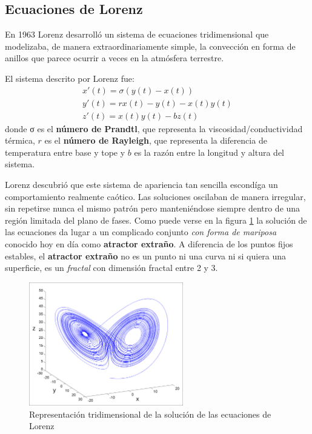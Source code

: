 \subsection{Ecuaciones de Lorenz}
\begin{definition}
En 1963 Lorenz desarrolló un sistema de ecuaciones tridimensional que modelizaba, de manera extraordinariamente simple, la convección en forma de anillos que parece ocurrir a veces en la atmósfera terrestre.

El sistema descrito por Lorenz fue:
\[\begin{array}{l}
x'(t) = σ(y(t)-x(t)) \\
y'(t) = rx(t)-y(t)-x(t)y(t)\\
z'(t) = x(t)y(t)-bz(t)
\end{array}\]
donde σ es el \textbf{número de Prandtl}, que representa la viscosidad/conductividad térmica, $r$ es el \textbf{número de Rayleigh}, que representa la diferencia de temperatura entre base y tope y $b$ es la razón entre la longitud y altura del sistema.
\end{definition}

Lorenz descubrió que este sistema de apariencia tan sencilla escondíga un comportamiento realmente caótico. Las soluciones oscilaban de manera irregular, sin repetirse nunca el mismo patrón pero manteniéndose siempre dentro de una región limitada del plano de fases. Como puede verse en la figura \ref{fig:Lorenz} la solución de las ecuaciones da lugar a un complicado conjunto \emph{con forma de mariposa} conocido hoy en día como \textbf{atractor extraño}. A diferencia de los puntos fijos estables, el \textbf{atractor extraño} no es un punto ni una curva ni si quiera una superficie, es un \emph{fractal} con dimensión fractal entre 2 y 3.

\begin{figure}[hbtp]
\centering
\includegraphics[width = 0.6\textwidth]{img/Lorenz.png}
\caption{Representación tridimensional de la solución de las ecuaciones de Lorenz}
\label{fig:Lorenz}
\end{figure}

